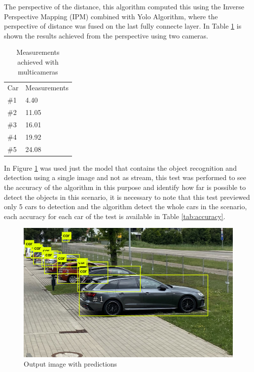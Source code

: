 The perspective of the distance, this algorithm computed this using the Inverse Perspective Mapping (IPM) combined with Yolo Algorithm, where the perspective of distance was fused on the last fully connecte layer. In Table \ref{tab:output_framework} is shown the results achieved from the perspective using two cameras. 

\begin{table}[H]
\centering
\caption{Measurements achieved with multicameras}
\begin{tabular}{l|l} 
\toprule
Car &  Measurements      \\
\#1   & 4.40        \\
\#2   & 11.05       \\
\#3   & 16.01       \\
\#4   & 19.92       \\
\#5   & 24.08       \\
\bottomrule
\end{tabular}
\label{tab:output_framework}
\end{table} 
 

In Figure \ref{fig:park_predict} was used just the model that contains the object recognition and detection using a single image and not as stream, this test was performed to see the accuracy of the algorithm in this purpose and identify how far is possible to detect the objects in this scenario, it is necessary to note that this test previewed only 5 cars to detection and the algorithm detect the whole cars in the scenario, each accuracy for each car of the test is available in Table \ref{tab:accuracy}.


\begin{figure}[H]
\centering
\includegraphics[scale=0.3]{imagens/predictions.jpg}
\caption{Output image with predictions }
\label{fig:park_predict}
\end{figure}




